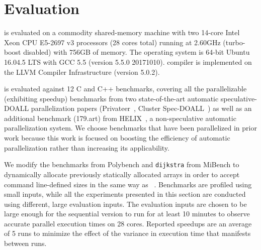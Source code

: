 \section{Evaluation}
\label{eval}
\name is evaluated on a commodity shared-memory machine with two 14-core
Intel Xeon CPU E5-2697 v3 processors (28 cores total) running at 2.60GHz
(turbo-boost disabled) with 756GB of memory. The operating system is
64-bit Ubuntu 16.04.5 LTS with GCC 5.5 (version 5.5.0 20171010).
\name compiler is implemented on the LLVM Compiler Infrastructure
(version 5.0.2)\cite{LLVM:CGO04}.


\name is evaluated against 12 C and C++ benchmarks, covering all the
parallelizable (exhibiting speedup) benchmarks from two
state-of-the-art automatic speculative-DOALL parallelization
papers (Privateer~\cite{johnson:12:pldi}, Cluster
Spec-DOALL~\cite{kim:12:cgo}) as well as an additional benchmark
(179.art) from HELIX~\cite{simone:12:cgo}, a non-speculative automatic
parallelization system.
We choose benchmarks that have been parallelized in prior work because this
work is focused on boosting the efficiency of automatic parallelization
rather than increasing its applicability.

We modify the benchmarks from Polybench and \texttt{dijkstra} from
MiBench to dynamically allocate previously statically allocated arrays in order to accept
command line-defined sizes in the same way as ~\cite{johnson:12:pldi, kim:12:cgo}.
%
%
Benchmarks are profiled using small inputs, while all the
experiments presented in this section are conducted using different,
large evaluation inputs. The evaluation inputs are chosen to be large
enough for the sequential version to run for at least 10 minutes to
observe accurate parallel execution times on 28 cores. Reported speedups
are an average of 5 runs to minimize the effect of the variance in execution
time that manifests between runs.


